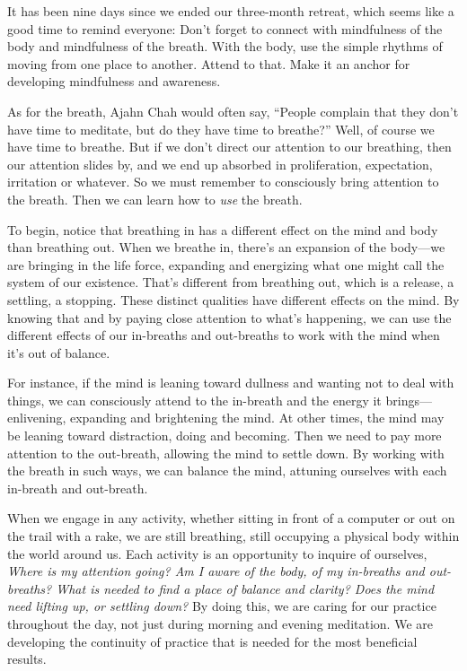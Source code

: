 It has been nine days since we ended our three-month retreat, which 
seems like a good time to remind everyone: Don't forget to connect with 
mindfulness of the body and mindfulness of the breath. With the body, 
use the simple rhythms of moving from one place to another. Attend to 
that. Make it an anchor for developing mindfulness and awareness.

As for the breath, Ajahn Chah would often say, ``People complain that 
they don't have time to meditate, but do they have time to breathe?'' 
Well, of course we have time to breathe. But if we don't direct our 
attention to our breathing, then our attention slides by, and we end up 
absorbed in proliferation, expectation, irritation or whatever. So we 
must remember to consciously bring attention to the breath. Then we can 
learn how to \emph{use} the breath.

To begin, notice that breathing in has a different effect on the mind
and body than breathing out. When we breathe in, there's an expansion of
the body---we are bringing in the life force, expanding and energizing
what one might call the system of our existence. That's different from
breathing out, which is a release, a settling, a stopping. These
distinct qualities have different effects on the mind.  By knowing that
and by paying close attention to what's happening, we can use the
\mbox{different} effects of our in-breaths and out-breaths to work with
the mind when it's out of balance.

For instance, if the mind is leaning toward dullness and wanting not to 
deal with things, we can consciously attend to the in-breath and the 
energy it brings---enlivening, expanding and brightening the mind. At 
other times, the mind may be leaning toward distraction, doing and 
becoming. Then we need to pay more attention to the out-breath, 
allowing the mind to settle down. By working with the breath in such 
ways, we can balance the mind, attuning ourselves with each in-breath 
and out-breath.

When we engage in any activity, whether sitting in front of a computer 
or out on the trail with a rake, we are still breathing, still 
occupying a physical body within the world around us. Each activity is 
an opportunity to inquire of ourselves, \emph{Where is my attention 
going? Am I aware of the body, of my in-breaths and out-breaths? What 
is needed to find a place of balance and clarity? Does the mind need 
lifting up, or settling down?} By doing this, we are caring for our 
practice throughout the day, not just during morning and evening 
meditation. We are developing the continuity of practice that is needed 
for the most beneficial results.

